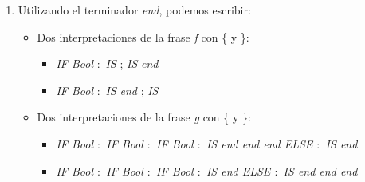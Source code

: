 \documentclass[a4paper, 10pt]{article}
\begin{document}
\begin{enumerate}
\begin{enumerate}
	\item Utilizando el terminador \textit{end}, podemos escribir:
	\begin{itemize}
		\item Dos interpretaciones de la frase \textit{f} con \{ y \}:
		\begin{itemize}
		\item \textit{IF Bool} $:$ \textit{IS} ; \textit{IS} \textit{end}
		\item \textit{IF Bool} $:$ \textit{IS} \textit{end} ; \textit{IS}
		\end{itemize}

		\item Dos interpretaciones de la frase \textit{g} con \{ y \}:
		\begin{itemize}
		\item \textit{IF Bool $:$ IF Bool $:$ IF Bool $:$ IS \textit{end} \textit{end} \textit{end} ELSE $:$ IS \textit{end}}
		\item \textit{IF Bool $:$ IF Bool $:$ IF Bool $:$ IS \textit{end} ELSE $:$ IS \textit{end} \textit{end} \textit{end}}
		\end{itemize}
		
	\end{itemize}
	
	\end{enumerate}
	\end{enumerate}				 		
	
			
\end{document}

